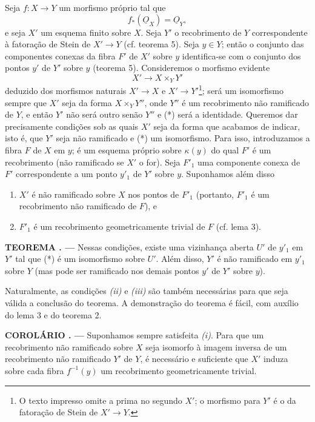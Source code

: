 \documentclass[11pt,twoside,openany]{book}
\numberwithin{equation}{section}
\newcommand{\src}[1]{%
  \phantomsection\hypertarget{src:#1}{}%
  \marginpar{\raggedleft\footnotesize\sffamily #1}%
}
\newcommand{\Osh}{\underline{O}}
\theoremstyle{plain}
\theoremstyle{definition}
\theoremstyle{remark}
\newcommand{\result}[2]{%
  \par\medskip\noindent\textbf{#1%
  \if\relax\detokenize{#2}\relax\else\space#2\fi. ---}\enspace
}
\newcommand{\FgaUnitKey}{frontmatter}
\renewcommand{\src}[1]{%
  \phantomsection\hypertarget{src:\FgaUnitKey:#1}{}%
  \marginpar{\raggedleft\footnotesize\sffamily #1}%
}
\begin{document}
Seja $f:X\longrightarrow Y$ um morfismo próprio tal que
\begin{equation}
  \tag{i}
  f_*(\Osh_X)=\Osh_Y,
\end{equation}
e seja $X'$ um esquema finito sobre $X$. Seja $Y'$ o recobrimento de $Y$
correspondente à fatoração de Stein de $X'\longrightarrow Y$
(cf. teorema 5). Seja $y\in Y$; então o conjunto das componentes conexas
da fibra $F'$ de $X'$ sobre $y$ identifica-se com o conjunto dos pontos
$y'$ de $Y'$ sobre $y$ (teorema 5). Consideremos o morfismo evidente
\begin{equation}
  \tag{*}
  X'\longrightarrow X\times_Y Y'
\end{equation}
deduzido dos morfismos naturais $X'\longrightarrow X$ e
$X'\longrightarrow Y'$\footnote{O texto impresso omite a prima no segundo
$X'$; o morfismo para $Y'$ é o da fatoração de Stein de
$X'\to Y$.}; será um isomorfismo sempre que $X'$ seja da forma
$X\times_Y Y''$, onde $Y''$ é um recobrimento não ramificado de $Y$, e
então $Y'$ não será outro senão $Y''$ e (*) será a identidade. Queremos dar
precisamente condições sob as quais $X'$ seja da forma que acabamos de
indicar, isto é, que $Y'$ seja não ramificado e (*) um isomorfismo. Para isso,
introduzamos a fibra $F$ de $X$ em $y$; é um esquema próprio sobre
$\kappa(y)$ do qual $F'$ é um recobrimento (não ramificado se $X'$ o for).
Seja $F'_1$ uma componente conexa de $F'$ correspondente a um ponto $y'_1$ de
$Y'$ sobre $y$. Suponhamos além disso
\begin{enumerate}
  \item[\textit{(ii)}] $X'$ é não ramificado sobre $X$ nos pontos de $F'_1$
    (portanto, $F'_1$ é um recobrimento não ramificado de $F$), e
  \item[\textit{(iii)}] $F'_1$ é um recobrimento geometricamente trivial de
    $F$ (cf. lema 3).
\end{enumerate}

\result{TEOREMA}{11} Nessas condições, existe uma vizinhança aberta $U'$ de
$y'_1$ em $Y'$ tal que (*) é um isomorfismo sobre $U'$. Além disso, $Y'$ é não
ramificado em $y'_1$ sobre $Y$ (mas pode ser ramificado nos demais pontos
$y'$ de $Y'$ sobre $y$).

Naturalmente, as condições \textit{(ii)} e \textit{(iii)} são também
necessárias para que seja válida a conclusão do teorema. A demonstração do
teorema é fácil, com auxílio do lema 3 e do teorema 2.

\src{214}
\result{COROLÁRIO}{1} Suponhamos sempre satisfeita \textit{(i)}. Para que um
recobrimento não ramificado sobre $X$ seja isomorfo à imagem inversa de um
recobrimento não ramificado $Y'$ de $Y$, é necessário e suficiente que $X'$
induza sobre cada fibra $f^{-1}(y)$ um recobrimento geometricamente trivial.
\end{document}
